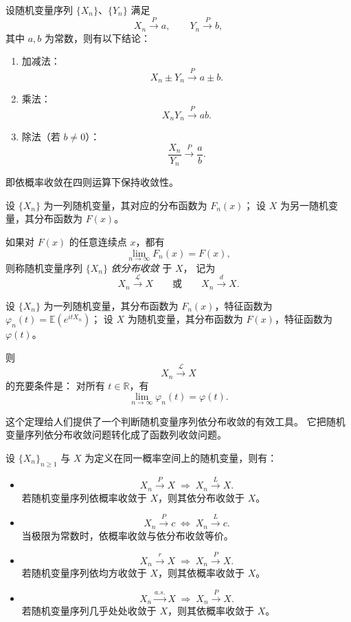 \begin{theorem}[依概率收敛的运算律]
设随机变量序列 $\{X_n\}$、$\{Y_n\}$ 满足
\[
X_n \xrightarrow{P} a, \qquad Y_n \xrightarrow{P} b,
\]
其中 $a,b$ 为常数，则有以下结论：

\begin{enumerate}
    \item 加减法：
    \[
    X_n \pm Y_n \xrightarrow{P} a \pm b.
    \]

    \item 乘法：
    \[
    X_n Y_n \xrightarrow{P} ab.
    \]

    \item 除法（若 $b \neq 0$）：
    \[
    \frac{X_n}{Y_n} \xrightarrow{P} \frac{a}{b}.
    \]
\end{enumerate}

即依概率收敛在四则运算下保持收敛性。
\end{theorem}
\begin{definition}[依分布收敛]
设 $\{X_n\}$ 为一列随机变量，其对应的分布函数为 $F_n(x)$；
设 $X$ 为另一随机变量，其分布函数为 $F(x)$。

如果对 $F(x)$ 的任意连续点 $x$，都有
\[
\lim_{n\to\infty} F_n(x) = F(x),
\]
则称随机变量序列 $\{X_n\}$ \emph{依分布收敛} 于 $X$，
记为
\[
X_n \xrightarrow{\ \mathcal{L}\ } X
\qquad\text{或}\qquad
X_n \xrightarrow{d} X.
\]
\end{definition}
\begin{theorem}
设 $\{X_n\}$ 为一列随机变量，其分布函数为 $F_n(x)$，特征函数为 
$\varphi_n(t)=\mathbb{E}(e^{itX_n})$；
设 $X$ 为随机变量，其分布函数为 $F(x)$，特征函数为 $\varphi(t)$。

则
\[
X_n \xrightarrow{\mathcal{L}} X
\]
的充要条件是：
对所有 $t\in\mathbb{R}$，有
\[
\lim_{n\to\infty} \varphi_n(t)=\varphi(t).
\]
\end{theorem}
这个定理给人们提供了一个判断随机变量序列依分布收敛的有效工具。
它把随机变量序列依分布收敛问题转化成了函数列收敛问题。
\begin{theorem}[随机变量几种收敛方式之间的关系]
设 $\{X_n\}_{n\ge 1}$ 与 $X$ 为定义在同一概率空间上的随机变量，则有：
\begin{itemize}
  \item
  \[
  X_n \xrightarrow{P} X \;\Longrightarrow\; X_n \xrightarrow{L} X .
  \]
  若随机变量序列依概率收敛于 $X$，则其依分布收敛于 $X$。

  \item
  \[
  X_n \xrightarrow{P} c \;\Longleftrightarrow\; X_n \xrightarrow{L} c .
  \]
  当极限为常数时，依概率收敛与依分布收敛等价。

  \item
  \[
  X_n \xrightarrow{r} X \;\Longrightarrow\; X_n \xrightarrow{P} X .
  \]
  若随机变量序列依均方收敛于 $X$，则其依概率收敛于 $X$。

  \item
  \[
  X_n \xrightarrow{a.s.} X \;\Longrightarrow\; X_n \xrightarrow{P} X .
  \]
  若随机变量序列几乎处处收敛于 $X$，则其依概率收敛于 $X$。
\end{itemize}
\end{theorem}
